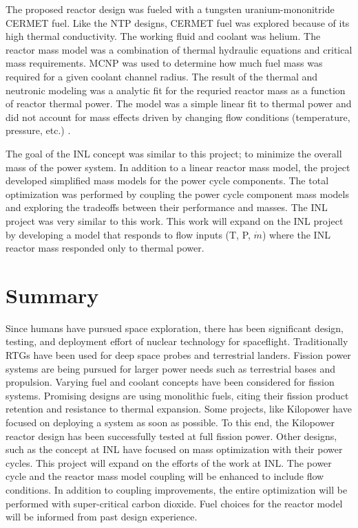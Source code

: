     The proposed reactor design was fueled with a tungsten uranium-mononitride
    CERMET fuel. Like the NTP designs, CERMET fuel was explored because of its
    high thermal conductivity. The working fluid and coolant was helium. The
    reactor mass model was a combination of thermal hydraulic equations and
    critical mass requirements. MCNP was used to determine how much fuel mass
    was required for a given coolant channel radius. The result of the thermal
    and neutronic modeling was a analytic fit for the requried reactor mass as a
    function of reactor thermal power. The model was a simple linear fit to
    thermal power and did not account for mass effects driven by changing flow
    conditions (temperature, pressure, etc.) \citep{webb_combined_2011}. 
    
    The goal of the INL concept was similar to this project; to minimize the overall mass of the
    power system. In addition to a linear reactor mass model, the project
    developed simplified mass models for the power cycle components.
    The total optimization was performed by coupling the power cycle
    component mass models and exploring the tradeoffs between their performance
    and masses. The INL project was very similar to this work. This work will
    expand on the INL project by developing a model that responds to flow inputs
    (T, P, $\dot{m}$) where the INL reactor mass responded only to thermal
    power.

\section{Summary}
Since humans have pursued space exploration, there has been significant design, 
testing, and deployment effort of nuclear technology for spaceflight. Traditionally
RTGs have been used for deep space probes and terrestrial landers. Fission power
systems are being pursued for larger power needs such as terrestrial bases and
propulsion. Varying fuel and coolant concepts have been considered for fission
systems. Promising designs are using monolithic fuels, citing their fission
product retention and resistance to thermal expansion. Some projects, like
Kilopower have focused on deploying a system as soon as possible. To this end,
the Kilopower reactor design has been successfully tested at full fission power.
Other designs, such as the concept at INL have focused on mass optimization with
their power cycles. This project will expand on the efforts of the work at INL.
The power cycle and the reactor mass model coupling will be enhanced to include
flow conditions. In addition to coupling improvements, the entire optimization
will be performed with super-critical carbon dioxide. Fuel choices for the
reactor model will be informed from past design experience.


